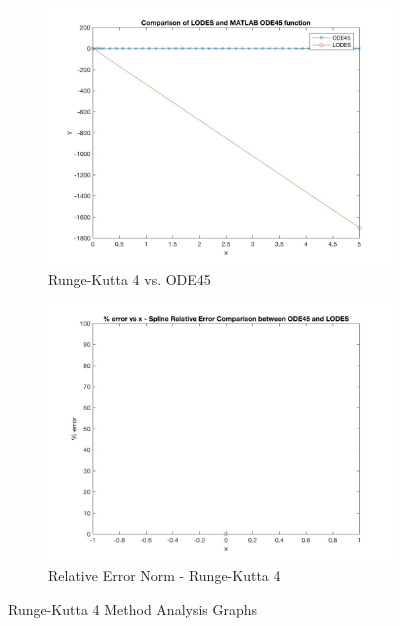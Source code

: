 \documentclass[12pt, titlepage]{article}
\begin{document}
\begin{figure}[H]
\centering
\begin{subfigure}{.55\textwidth}
  \centering
  \includegraphics[width=\linewidth]{images/Test3/4LODESvsMATLABPlot.jpg}
  \caption{Runge-Kutta 4 vs. ODE45}
  \label{fig:rk3a}
\end{subfigure}%
\begin{subfigure}{.55\textwidth}
  \centering
  \includegraphics[width=\linewidth]{images/Test3/4RelativeErrorPlot.jpg}
  \caption{Relative Error Norm - Runge-Kutta 4}
  \label{fig:rk3b}
\end{subfigure}
\caption{Runge-Kutta 4 Method Analysis Graphs}
\label{fig:rk3}
\end{figure}
\end{document}
